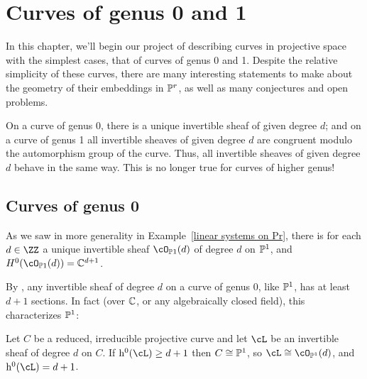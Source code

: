 

\chapter{Curves of genus 0 and 1}\label{genus 0 and 1 chapter}

In this chapter, we'll begin our project of describing curves in projective space with the simplest cases, that of curves of genus 0 and 1. Despite the relative simplicity of these curves, there are many interesting statements to make about the geometry of their embeddings in $\PP^r$, as well as many conjectures and open problems.

On a curve of genus 0, there is a unique invertible sheaf of given degree $d$; and on a curve of genus 1 all invertible sheaves of given degree $d$ are congruent modulo the automorphism group of the curve. Thus, all invertible sheaves of given degree $d$ behave in the same way. This is no longer true for curves of higher genus!

\section{Curves of genus 0} 

As we saw in more generality in Example~\ref{linear systems on Pr}, there is for each $d \in \ZZ$  a unique invertible sheaf $\cO_{\PP1} (d)$
of degree $d$ on $\PP^1$, and $H^0(\cO_{\PP1} (d)) = \CC^{d+1}$.

By \TRR, any invertible sheaf of degree $d$ on a curve of genus 0, like $\PP^1$, has at least $d+1$ sections. In fact (over $\CC$, or any algebraically
closed field), this characterizes $\PP^1$:

\begin{theorem}\label{characterization of P1}
Let $C$ be a reduced, irreducible projective curve and let $\cL$ be an invertible sheaf of degree $d$ on $C$. If $\h^0(\cL) \geq d+1$ then
$C \cong \PP^1$, so $\cL \cong \cO_{\PP^1}(d)$, and $\h^0(\cL) = d+1$. 
\end{theorem}

